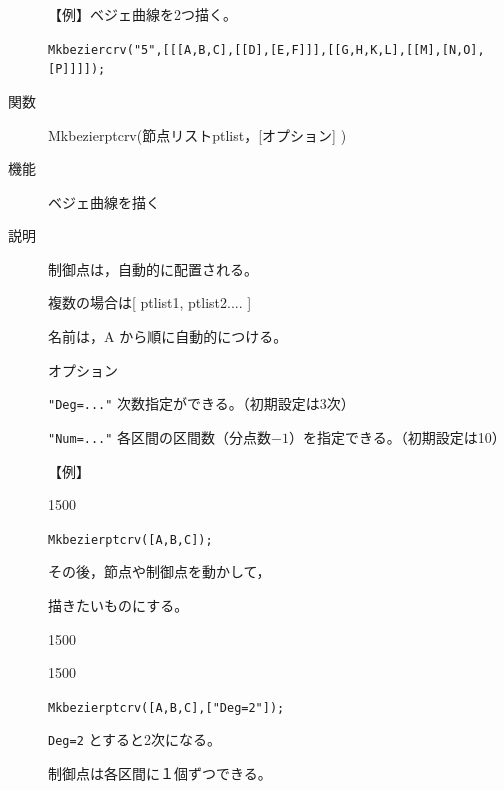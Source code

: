 \documentclass[papersize,a4paper,10pt,uplatex]{jsarticle}
\begin{document}
\begin{description}
\vspace{\baselineskip}
【例】ベジェ曲線を2つ描く。

\verb|Mkbeziercrv("5",[[[A,B,C],[[D],[E,F]]],[[G,H,K,L],[[M],[N,O],[P]]]]);|

 \scalebox{0.95}{}

\vspace{\baselineskip}
\hypertarget{mkbezierptcrv}{}
\item[関数]Mkbezierptcrv(節点リストptlist，[オプション] )
\item[機能]ベジェ曲線を描く
\item[説明]制御点は，自動的に配置される。

複数の場合は[ ptlist1, ptlist2.... ]

名前は，A から順に自動的につける。

オプション

\verb|"Deg=..."| 次数指定ができる。（初期設定は3次）

\verb|"Num=..."| 各区間の区間数（分点数$-1$）を指定できる。（初期設定は10）

\vspace{\baselineskip}

【例】

\begin{layer}{150}{0}
\end{layer}

\verb|Mkbezierptcrv([A,B,C]);|

\vspace{23mm}

その後，節点や制御点を動かして，\par
描きたいものにする。

\begin{layer}{150}{0}
\end{layer}

\vspace{35mm}

\begin{layer}{150}{0}
\end{layer}

\verb|Mkbezierptcrv([A,B,C],["Deg=2"]);|

\verb|Deg=2| とすると2次になる。

制御点は各区間に１個ずつできる。

\vspace{20mm}


\end{description}
\end{document}
